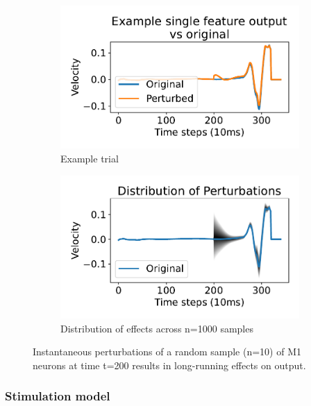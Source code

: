 \documentclass[12pt]{iopart}
\begin{document}
\begin{figure}[h]
	\centering
	\begin{subfigure}[c]{0.48\textwidth}
	    \centering
	    \includegraphics[width=\textwidth]{perturbe_single.pdf}
	    \caption{Example trial}
	\end{subfigure}
	\hfill
	\begin{subfigure}[c]{0.48\textwidth}
	    \centering
	    \includegraphics[width=\textwidth]{perturbe_dist.pdf}
	    \caption{Distribution of effects across n=1000 samples}
	\end{subfigure}
	\hfill
	\caption{Instantaneous perturbations of a random sample (n=10) of M1
	         neurons at time t=200 results in long-running effects on output.}
	\label{fig:dynamics}
\end{figure}

\subsubsection{Stimulation model}
\end{document}
